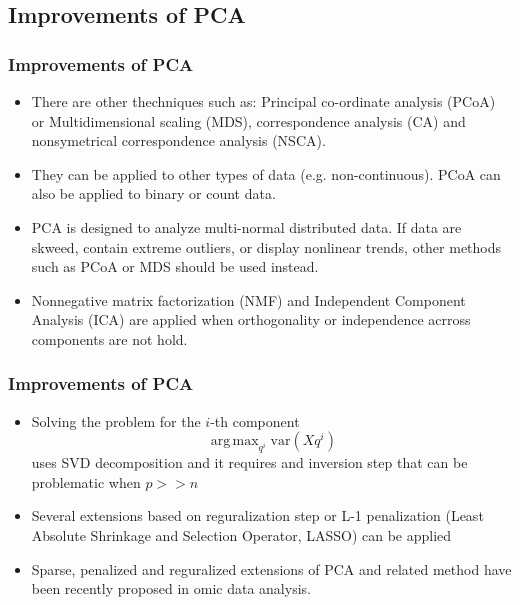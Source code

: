 \documentclass[10pt,xcolor=dvipsnames]{beamer}\usepackage[]{graphicx}\usepackage[]{color}
\DeclareMathOperator{\argmax}{arg\,max}
\begin{document}
\subsection{Improvements of PCA}


\begin{frame}\frametitle{Improvements of PCA}

\begin{itemize}
\item There are other thechniques such as: Principal co-ordinate analysis (PCoA) or Multidimensional scaling (MDS), correspondence analysis (CA) and nonsymetrical correspondence analysis (NSCA).
\pause
\item They can be applied to other types of data (e.g. non-continuous). PCoA can also be applied to binary or count data.
\pause
\item PCA is designed to analyze multi-normal distributed data. If data are skweed, contain extreme outliers, or display nonlinear trends, other methods such as 
PCoA or MDS should be used instead.
\pause
\item Nonnegative matrix factorization (NMF) and Independent Component Analysis (ICA) are applied when orthogonality or independence acrross components are not hold.
\end{itemize}

\end{frame}


\begin{frame}\frametitle{Improvements of PCA}

\begin{itemize}
\item Solving the problem for the $i$-th component $$ \argmax_{q^i} \text{var}(Xq^i)$$ uses SVD decomposition and it requires and inversion step that can be problematic when   $p >> n$
\item Several extensions based on reguralization step or L-1 penalization (Least Absolute Shrinkage and Selection Operator, LASSO) can be applied
\item Sparse, penalized and reguralized extensions of PCA and related method have been recently proposed in omic data analysis.
\end{itemize}
\end{frame}
\end{document}
